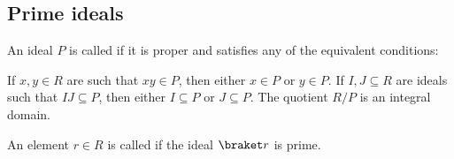 \subsection{Prime ideals}\label{subsec:prime_ideals}

\begin{definition}\label{def:prime_ring_ideal}
  An ideal \( P \) is called  if it is proper and satisfies any of the equivalent conditions:
  \begin{thmenum}
     If \( x, y \in R \) are such that \( xy \in P \), then either \( x \in P \) or \( y \in P \).
     If \( I, J \subseteq R \) are ideals such that \( IJ \subseteq P \), then either \( I \subseteq P \) or \( J \subseteq P \).
     The quotient \( R / P \) is an integral domain.
  \end{thmenum}

  An element \( r \in R \) is called  if the ideal \( \braket r \) is prime.
\end{definition}
